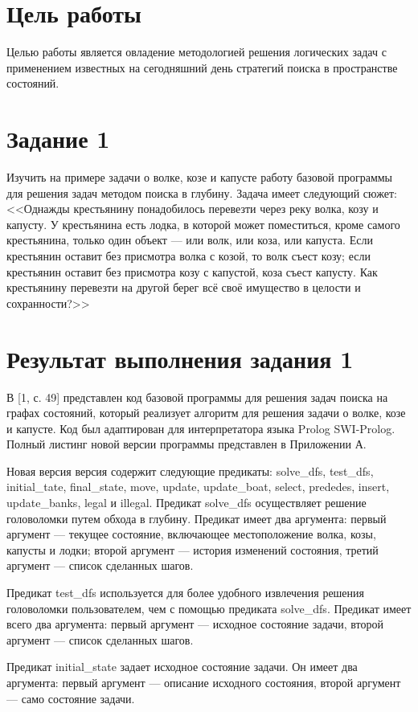 \documentclass{article}
\begin{document}
\section*{Цель работы}
Целью работы является овладение методологией решения логических задач
с применением известных на сегодняшний день стратегий поиска в
пространстве состояний.
\section*{Задание 1}
Изучить на примере задачи о волке, козе и капусте работу базовой
программы для решения задач методом поиска в глубину. Задача имеет
следующий сюжет: \\
<<Однажды крестьянину понадобилось перевезти через реку волка, козу и
капусту. У крестьянина есть лодка, в которой может поместиться, кроме
самого крестьянина, только один объект — или волк, или коза, или
капуста. Если крестьянин оставит без присмотра волка с козой, то волк
съест козу; если крестьянин оставит без присмотра козу с капустой,
коза съест капусту. Как крестьянину перевезти на другой берег всё своё
имущество в целости и сохранности?>>
\section*{Результат выполнения задания 1}
В [1, с. 49] представлен код базовой программы для решения задач
поиска на графах состояний, который реализует алгоритм для решения
задачи о волке, козе и капусте. Код был адаптирован для интерпретатора
языка Prolog SWI-Prolog. Полный листинг новой версии программы представлен в
Приложении А.

Новая версия версия содержит следующие предикаты: solve\_dfs,
test\_dfs, initial\_tate, final\_state, move, update, update\_boat,
select, prededes, insert, update\_banks, legal и illegal.
Предикат solve\_dfs осуществляет решение головоломки путем обхода в
глубину. Предикат имеет два аргумента: первый аргумент ---
текущее состояние, включающее местоположение волка, козы, капусты и
лодки; второй аргумент --- история изменений состояния, третий
аргумент --- список сделанных шагов.

Предикат test\_dfs используется для более удобного извлечения решения
головоломки пользователем, чем с помощью предиката
solve\_dfs. Предикат имеет всего два аргумента: первый аргумент ---
исходное состояние задачи, второй аргумент --- список сделанных шагов.

Предикат initial\_state задает исходное состояние задачи. Он имеет два
аргумента: первый аргумент --- описание исходного состояния, второй
аргумент --- само состояние задачи.
\end{document}
